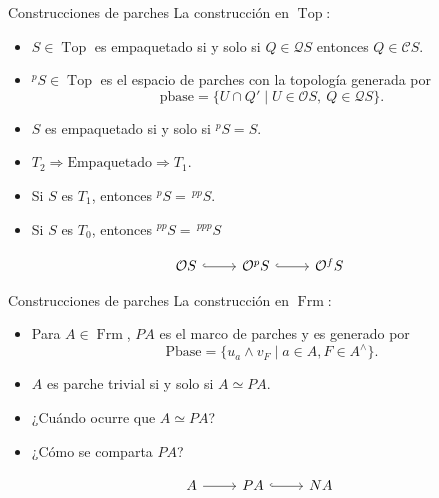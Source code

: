 \documentclass[compress,12pt]{beamer}
\DeclareMathOperator{\Frm}{Frm}
\DeclareMathOperator{\Top}{Top}
\begin{document}
\begin{frame}[fragile]{Construcciones de parches}
La construcción en $\Top$:
\begin{itemize}
    \item $S\in \Top$ es empaquetado si y solo si $Q\in \mathcal{Q}S$ entonces $Q\in \mathcal{C}S$. 
    \pause
    \item $^pS\in \Top$ es el espacio de parches con la topología generada por 
    \[
    \mbox{pbase} = \{U\cap Q'\mid U\in \mathcal{O}S,\ Q\in \mathcal{Q}S\}.
    \]
    \pause
    \item $S$ es empaquetado si y solo si $^pS = S$.
    \pause
    \item $T_2 \Rightarrow \mbox{Empaquetado} \Rightarrow T_1$.
    \pause
    \item Si $S$ es $T_1$, entonces $^pS = \,^{pp}S$.
    \pause
    \item Si $S$ es $T_0$, entonces $^{pp}S = \,^{ppp}S$
    \pause
\end{itemize}
\[
\begin{tikzcd}
	{\mathcal{O}S} & {\mathcal{O}^pS} & {\mathcal{O}^fS}
	\arrow[hook, from=1-1, to=1-2]
	\arrow[hook, from=1-2, to=1-3]
\end{tikzcd}
\]
\end{frame}

\begin{frame}[fragile]{Construcciones de parches}
	La construcción en $\Frm$:
	\begin{itemize}
		\item Para $A\in \Frm$, $PA$ es el marco de parches y es generado por 
		\[
		\mbox{Pbase}=\{u_a\wedge v_F\mid a\in A, F\in A^\wedge\}.
		\]
		\pause 
		\item $A$ es parche trivial si y solo si $A\simeq PA$.
		\pause
		\item ¿Cuándo ocurre que $A\simeq PA$?
		\pause
		\item ¿Cómo se comparta $PA$?
	\pause
	\end{itemize}
	\[\begin{tikzcd}
	{A} & {PA} & {NA}
	\arrow[from=1-1, to=1-2]
	\arrow[hook, from=1-2, to=1-3]
\end{tikzcd}\]
\end{frame}
\end{document}
